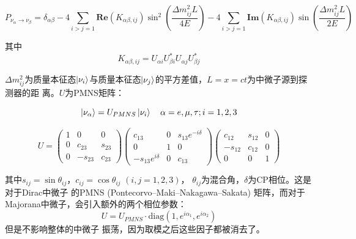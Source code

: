 \begin{equation}
    \label{oscillation}
    P_{\nu_\alpha \to \nu_\beta} = \delta_{\alpha\beta} - 4\sum_{i>j=1} \mathbf{Re} (K_{\alpha\beta,ij}) \sin^2\left(\frac{\Delta m_{ij}^2 L}{4E}\right) - 4 \sum_{i>j=1} \mathbf{Im} (K_{\alpha\beta,ij}) \sin\left (\frac{\Delta m_{ij}^2 L}{2E}\right) 
\end{equation}

其中
\begin{equation}
    K_{\alpha\beta,ij} = U_{\alpha i} U_{\beta i}^* U_{\alpha j} U_{\beta j}^*
\end{equation}

$\Delta m^2_{ij}$为质量本征态$\ket{\nu_i}$与质量本征态$\ket{\nu_j}$的平方差值，$L=x=ct$为中微子源到探测器的距
离。$U$为PMNS矩阵：

\begin{equation}
    \ket{\nu_\alpha} = U_{PMNS}\ket{\nu_i}\quad \alpha=e,\mu,\tau;i=1,2,3
\end{equation}

\begin{equation}
    \label{PMNS}
    U = \begin{pmatrix}
        1 & 0 & 0 \\
        0 & c_{23} & s_{23} \\
        0 & -s_{23} & c_{23}
    \end{pmatrix}
    \begin{pmatrix}
        c_{13} & 0 & s_{13} e^{-i\delta} \\
        0 & 1 & 0 \\
        -s_{13} e^{i\delta} & 0 & c_{13}
    \end{pmatrix}
    \begin{pmatrix}
        c_{12} & s_{12} & 0 \\
        -s_{12} & c_{12} & 0 \\
        0 & 0 & 1
    \end{pmatrix}
\end{equation}

\bigskip

其中$s_{ij}=\sin\theta_{ij}$，$c_{ij}=\cos\theta_{ij}$ $ (i,j=1,2,3) $，
$\theta_{ij}$为混合角，$\delta$为CP相位。这是对于Dirac中微子
的PMNS (Pontecorvo–Maki–Nakagawa–Sakata) 矩阵，而对于Majorana中微子，会引入额外的两个相位参数：
\begin{equation}
    U=U_{PMNS}·\text{diag} (1,e^{i\alpha_1},e^{i\alpha_2}) 
\end{equation}
但是不影响整体的中微子
振荡，因为取模之后这些因子都被消去了。

